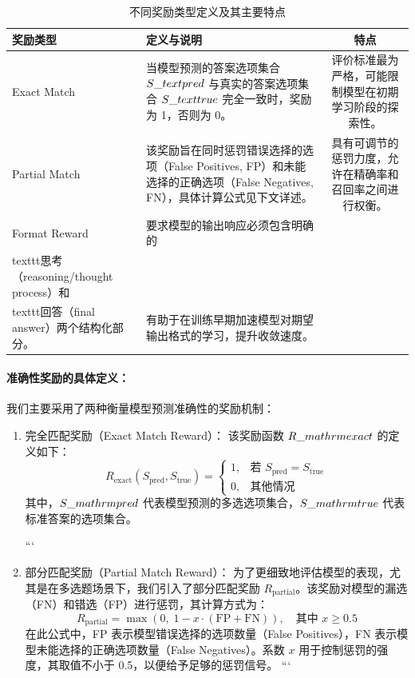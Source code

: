 \documentclass{pkuthesis}
\begin{document}
\begin{table}[h]
\centering
\caption{不同奖励类型定义及其主要特点}
\begin{tabular}{l|p{8cm}|c}
\hline
奖励类型 & 定义与说明 & 特点 \\
\hline
Exact Match & 当模型预测的答案选项集合 $S\_{\\text{pred}}$ 与真实的答案选项集合 $S\_{\\text{true}}$ 完全一致时，奖励为 1，否则为 0。 & 评价标准最为严格，可能限制模型在初期学习阶段的探索性。 \\
Partial Match & 该奖励旨在同时惩罚错误选择的选项（False Positives, FP）和未能选择的正确选项（False Negatives, FN），具体计算公式见下文详述。 & 具有可调节的惩罚力度，允许在精确率和召回率之间进行权衡。 \\
Format Reward & 要求模型的输出响应必须包含明确的\\texttt{思考}（reasoning/thought process）和\\texttt{回答}（final answer）两个结构化部分。 & 有助于在训练早期加速模型对期望输出格式的学习，提升收敛速度。 \\
\hline
\end{tabular}
\end{table}

\paragraph{准确性奖励的具体定义：}
我们主要采用了两种衡量模型预测准确性的奖励机制：

\begin{enumerate}[label=(\arabic*)]
\item 完全匹配奖励（Exact Match Reward）：
该奖励函数 $R\_{\\mathrm{exact}}$ 的定义如下：
$$R_{\mathrm{exact}}(S_{\mathrm{pred}}, S_{\mathrm{true}}) = \begin{cases} 1, & \text{若 } S_{\mathrm{pred}} = S_{\mathrm{true}} \\ 0, & \text{其他情况} \end{cases}$$
其中，$S\_{\\mathrm{pred}}$ 代表模型预测的多选选项集合，$S\_{\\mathrm{true}}$ 代表标准答案的选项集合。

```
\item 部分匹配奖励（Partial Match Reward）：
为了更细致地评估模型的表现，尤其是在多选题场景下，我们引入了部分匹配奖励 $R_{\mathrm{partial}}$。该奖励对模型的漏选（FN）和错选（FP）进行惩罚，其计算方式为：
$$R_{\mathrm{partial}} = \max\left(0,\;1 - x \cdot (\mathrm{FP} + \mathrm{FN})\right),\quad \text{其中 } x \ge 0.5$$
在此公式中，FP 表示模型错误选择的选项数量（False Positives），FN 表示模型未能选择的正确选项数量（False Negatives）。系数 $x$ 用于控制惩罚的强度，其取值不小于 0.5，以便给予足够的惩罚信号。
```

\end{enumerate}
\end{document}
